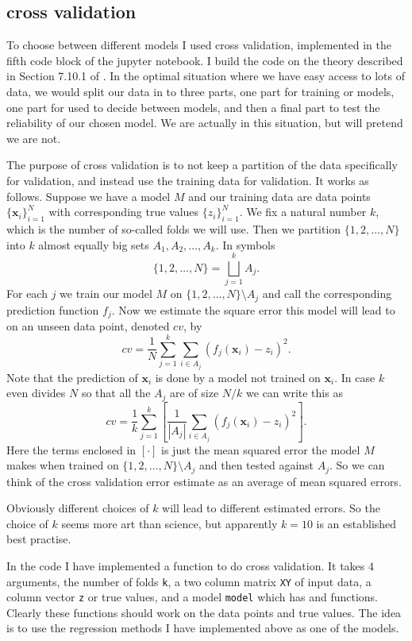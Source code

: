 \documentclass[parskip=half]{scrartcl}
\theoremstyle{definition}
\theoremstyle{remark}
\newcommand{\vect}[1]{{\bm{#1}}}
\newcommand{\funcname}[1]{{\color{blue}{\texttt{#1}}}}
\newcommand{\varname}[1]{\texttt{#1}}
\begin{document}
\subsection{cross validation}

To choose between different models I used cross validation, implemented in the fifth code block of the jupyter notebook. 
I build the code on the theory described in Section 7.10.1 of \cite{htf:esl}. 
In the optimal situation where we have easy access to lots of data, we would split our data in to three parts, one part for training or models, one part for used to decide between models, and then a final part to test the reliability of our chosen model. 
We are actually in this situation, but will pretend we are not. 

The purpose of cross validation is to not keep a partition of the data specifically for validation, and instead use the training data for validation. 
It works as follows.
Suppose we have a model $M$ and our training data are data points $\{\vect{x}_i\}_{i=1}^N$ with corresponding true values $\{z_i\}_{i=1}^N$.
We fix a natural number $k$, which is the number of so-called folds we will use.  
Then we partition $\{1,2,\ldots, N\}$ into $k$ almost equally big sets $A_1, A_2, \ldots, A_k$.
In symbols 
\[
	\{1,2,\ldots, N\} = \bigsqcup_{j=1}^k A_j.
\]  
For each $j$ we train our model $M$ on $\{1,2,\ldots, N\} \setminus A_j$ and call the corresponding prediction function $f_j$. 
Now we estimate the square error this model will lead to on an unseen data point, denoted $cv$, by 
\[
	cv = \frac{1}{N} \sum_{j=1}^k \sum_{i \in A_j} (f_j(\vect{x}_i) - z_i)^2. 
\]
Note that the prediction of $\vect{x}_i$ is done by a model not trained on $\vect{x}_i$.
In case $k$ even divides $N$ so that all the $A_j$ are of size $N/k$ we can write this as 
\[
	cv = \frac{1}{k} \sum_{j=1}^k \left[ \frac{1}{|A_j|} \sum_{i \in A_j} (f_j(\vect{x}_i) - z_i)^2 \right].
\]
Here the terms enclosed in $[\cdot]$ is just the mean squared error the model $M$ makes when trained on $\{1,2,\ldots, N\} \setminus A_j$ and then tested against $A_j$.
So we can think of the cross validation error estimate as an average of mean squared errors. 

Obviously different choices of $k$ will lead to different estimated errors. 
So the choice of $k$ seems more art than science, but apparently $k=10$ is an established best practise.

In the code I have implemented a function \funcname{cross{\_}validation} to do cross validation. 
It takes 4 arguments, the number of folds \varname{k}, a two column matrix \varname{XY} of input data, a column vector \varname{z} or true values, and a model \varname{model} which has \funcname{train} and \funcname{predict} functions. 
Clearly these functions should work on the data points and true values. 
The idea is to use the regression methods I have implemented above as one of the models. 
\end{document}
